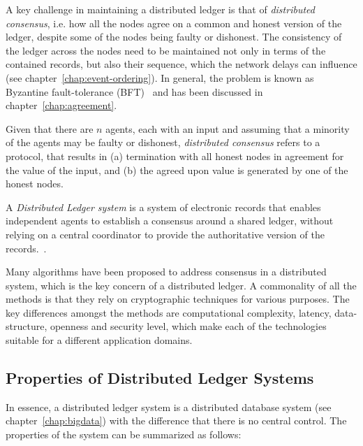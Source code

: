 A key challenge in maintaining a distributed ledger is that of {\em distributed consensus}, i.e. how all the nodes agree on a common 
and honest version of the ledger, despite some of the nodes being faulty or dishonest. The consistency of the ledger across the nodes 
need to be maintained not only in terms of the contained records, but also their sequence, which the network delays can influence (see
chapter~\ref{chap:event-ordering}). In general, the problem is known as Byzantine fault-tolerance (BFT)~\citep{Lamport:1982} and has 
been discussed in chapter~\ref{chap:agreement}. 

\begin{definition} 
	Given that there are $n$ agents, each with an input and assuming that a minority of the agents may be faulty or dishonest, 
	{\em distributed consensus} refers to a protocol, that results in (a) termination with all honest nodes in agreement for 
	the value of the input, and (b) the agreed upon value is generated by one of the honest nodes.
\end{definition}

\begin{definition} 
	A {\em Distributed Ledger system} is a system of electronic records that enables independent agents to establish a consensus 
	around a shared ledger, without relying on a central coordinator to provide the authoritative version of the 
	records.~\citep{Rauchs:2018}.
\end{definition}

Many algorithms have been proposed to address consensus in a distributed system, which is the key concern of a distributed ledger. A 
commonality of all the methods is that they rely on cryptographic techniques for various purposes. The key differences amongst the methods 
are computational complexity, latency, data-structure, openness and security level, which make each of the technologies suitable for a
different application domains.  

\subsection{Properties of Distributed Ledger Systems}

In essence, a distributed ledger system is a distributed database system (see chapter~\ref{chap:bigdata}) with the difference that there 
is no central control. The properties of the system can be summarized as follows:

